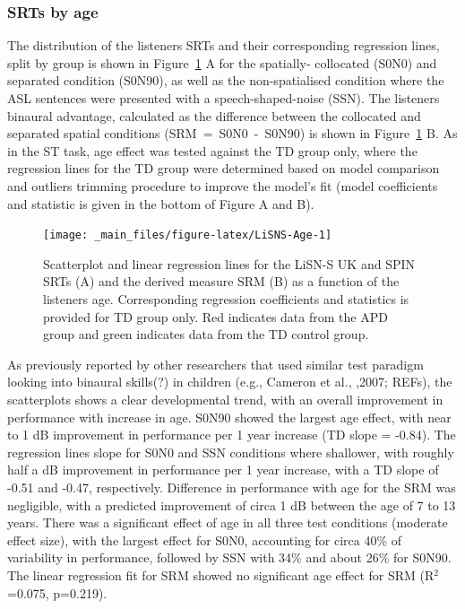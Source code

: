 \documentclass[a4paper, twoside]{templates/ociamthesis}
\begin{document}
\hypertarget{srts-by-age}{%
\subsubsection*{SRTs by age}\label{srts-by-age}}

The distribution of the listeners SRTs and their corresponding regression lines, split by group is shown in Figure~\ref{fig:LiSNS-Age} A for the spatially- collocated (S0N0) and separated condition (S0N90), as well as the non-spatialised condition where the ASL sentences were presented with a speech-shaped-noise (SSN). The listeners binaural advantage, calculated as the difference between the collocated and separated spatial conditions (SRM~=~S0N0~-~S0N90) is shown in Figure~\ref{fig:LiSNS-Age} B. As in the ST task, age effect was tested against the TD group only, where the regression lines for the TD group were determined based on model comparison and outliers trimming procedure to improve the model's fit (model coefficients and statistic is given in the bottom of Figure A and B).

\begin{figure}

{\centering \texttt{[image: \_main\_files/figure-latex/LiSNS-Age-1]} 

}

\caption{Scatterplot and linear regression lines for the LiSN-S UK and SPIN SRTs (A) and the derived measure SRM (B) as a function of the listeners age. Corresponding regression coefficients and statistics is provided for TD group only. Red indicates data from the APD group and green indicates data from the TD control group.}\label{fig:LiSNS-Age}
\end{figure}

As previously reported by other researchers that used similar test paradigm looking into binaural skills(?) in children (e.g., Cameron et al., ,2007; REFs), the scatterplots shows a clear developmental trend, with an overall improvement in performance with increase in age. S0N90 showed the largest age effect, with near to 1 dB improvement in performance per 1 year increase (TD slope = -0.84). The regression lines slope for S0N0 and SSN conditions where shallower, with roughly half a dB improvement in performance per 1 year increase, with a TD slope of -0.51 and -0.47, respectively. Difference in performance with age for the SRM was negligible, with a predicted improvement of circa 1 dB between the age of 7 to 13 years. There was a significant effect of age in all three test conditions (moderate effect size), with the largest effect for S0N0, accounting for circa 40\% of variability in performance, followed by SSN with 34\% and about 26\% for S0N90. The linear regression fit for SRM showed no significant age effect for SRM (R\(^{2}\)=0.075, p=0.219).
\end{document}
